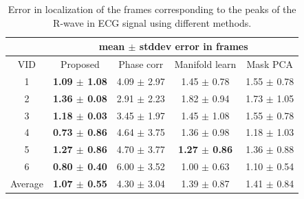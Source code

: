 \documentclass[journal]{IEEEtran}
\begin{document}
%	
\begin{table}[h]
\begin{minipage}[t]{0.95\linewidth}
\centering
\caption{Error in localization of the frames corresponding to the peaks of the R-wave in ECG signal using different methods.}
\setlength\tabcolsep{3pt} 
\begin{tabular}{|c|c|c|c|c|}
\hline
\multicolumn{1}{|l|}{} & \multicolumn{4}{c|}{mean $\pm$ stddev error in frames} \\ \hline
VID & Proposed & Phase corr\cite{Karadayi2006} & Manifold learn\cite{Wachinger2012} & Mask PCA\cite{Panayiotou2014} \\ \hline
1 & \bf{1.09 $\pm$ 1.08} & 4.09 $\pm$ 2.97 & 1.45 $\pm$ 0.78 & 1.55 $\pm$ 0.78 \\ \hline
2 & \bf{1.36 $\pm$ 0.08} & 2.91 $\pm$ 2.23 & 1.82 $\pm$ 0.94 & 1.73 $\pm$ 1.05 \\ \hline
3 & \bf{1.18 $\pm$ 0.03} & 3.45 $\pm$ 1.97 & 1.45 $\pm$ 1.08 & 1.55 $\pm$ 0.78 \\ \hline
4 & \bf{0.73 $\pm$ 0.86} & 4.64 $\pm$ 3.75 & 1.36 $\pm$ 0.98 & 1.18 $\pm$ 1.03 \\ \hline
5 & \bf{1.27 $\pm$ 0.86} & 4.70 $\pm$ 3.77 & \bf{1.27 $\pm$ 0.86} & 1.36 $\pm$ 0.88 \\ \hline
6 & \bf{0.80 $\pm$ 0.40} & 6.00 $\pm$ 3.52 & 1.00 $\pm$ 0.63 & 1.10 $\pm$ 0.54 \\ \hline \hline
Average & \bf{1.07 $\pm$ 0.55} & 4.30 $\pm$ 3.04 & 1.39 $\pm$ 0.87 & 1.41 $\pm$ 0.84\\
\hline
\end{tabular}
\label{table:R_peak_localization}
\end{minipage}
\end{table}
%	
\end{document}
